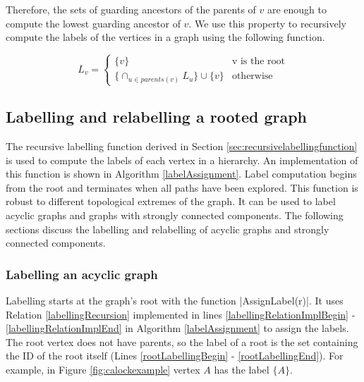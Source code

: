 Therefore, the sets of guarding ancestors of the parents of $v$ are enough to compute the lowest guarding ancestor of $v$. 
We use this property to recursively compute the labels of the vertices in a graph using the following function.

\begin{equation}\label{labellingRecursion}
	L_v = 
	\begin{cases}
		\{v\} & \text{v is the root} \\
		\{ \cap_{u\in parents(v)} L_u\} \cup \{v\} & \text{otherwise}
	\end{cases}
\end{equation}


\subsection{Labelling and relabelling a rooted graph}






The recursive labelling function derived in Section \ref{sec:recursivelabellingfunction} is used to compute the labels of each vertex in a hierarchy. An implementation of this function is shown in Algorithm \ref{labelAssignment}. Label computation begins from the root and terminates when all paths have been explored. This function is robust to different topological extremes of the graph. It can be used to label acyclic graphs and graphs with strongly connected components. The following sections discuss the labelling and relabelling of acyclic graphs and strongly connected components. 

\subsubsection{Labelling an acyclic graph}
Labelling starts at the graph's root with the function \inline|AssignLabel(r)|. It uses Relation \ref{labellingRecursion} implemented in lines \ref{labellingRelationImplBegin} - \ref{labellingRelationImplEnd} in Algorithm \ref{labelAssignment} to assign the labels. The root vertex does not have parents, so the label of a root is the set containing the ID of the root itself (Lines \ref{rootLabellingBegin} - \ref{rootLabellingEnd}). For example, in Figure \ref{fig:calockexample} vertex $A$ has the label $\{A\}$.

